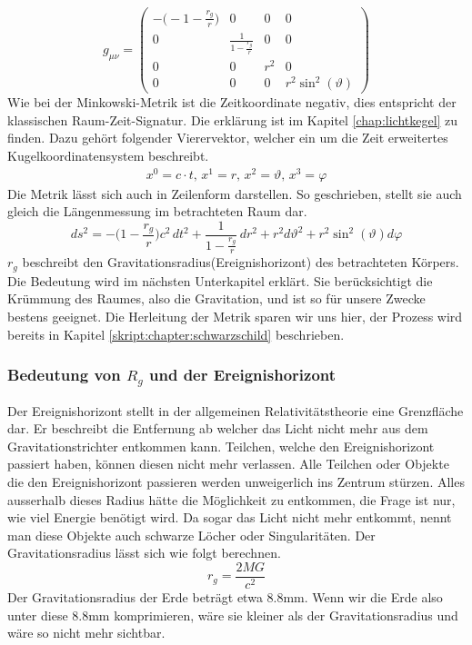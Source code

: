 \begin{refsection}
	\begin{equation}
	g_{\mu\nu}=
	\begin{pmatrix}
	-\biggl(-1- \displaystyle \frac{r_{g}}{r}\biggr) & 0 & 0 & 0 \\
	0 & \frac{\displaystyle 1}{\displaystyle1-\frac{r_{g}}{r}} & 0 & 0 \\
	0 & 0 & r^{2} & 0 \\
	0 & 0 & 0 & r^{2}\sin^{2}(\vartheta)
	\end{pmatrix}
	\end{equation}
	Wie bei der Minkowski-Metrik ist die Zeitkoordinate negativ, dies entspricht der klassischen Raum-Zeit-Signatur. Die erklärung ist im Kapitel \ref{chap:lichtkegel} zu finden.
	Dazu gehört folgender Vierervektor, welcher ein um die Zeit erweitertes Kugelkoordinatensystem beschreibt.
	\begin{align*}
	x^{0}=c \cdot t, \,
	x^{1}=r,\,
	x^{2}=\vartheta,\,
	x^{3}=\varphi
	\end{align*}
	Die Metrik lässt sich auch in Zeilenform darstellen. So geschrieben, stellt sie auch gleich die Längenmessung im betrachteten Raum dar.
	\begin{equation}
	ds^2
	=
	-\biggl(1-\frac{r_g}r\biggr)c^2\,dt^2
	+
	\frac{1}{\displaystyle 1-\frac{r_g}r}\,dr^2 
	+
	r^2d\vartheta^2 
	+ 
	r^2\sin^2(\vartheta)d\varphi
	\end{equation}
	$r_g$ beschreibt den Gravitationsradius(Ereignishorizont) des betrachteten Körpers. Die Bedeutung wird im nächsten Unterkapitel erklärt.
	Sie berücksichtigt die Krümmung des Raumes, also die Gravitation, und ist so für unsere Zwecke bestens geeignet. 
	Die Herleitung der Metrik sparen wir uns hier, der Prozess wird bereits in Kapitel \ref{skript:chapter:schwarzschild} beschrieben.
	
	\subsubsection{Bedeutung von $R_{g}$ und der Ereignishorizont}
	
	Der Ereignishorizont stellt in der allgemeinen Relativitätstheorie eine Grenzfläche dar. Er beschreibt die Entfernung ab welcher das Licht nicht mehr aus dem Gravitationstrichter entkommen kann. Teilchen, welche den Ereignishorizont passiert haben, können diesen nicht mehr verlassen. Alle Teilchen oder Objekte die den Ereignishorizont passieren werden unweigerlich ins Zentrum stürzen. Alles ausserhalb dieses Radius hätte die Möglichkeit zu entkommen, die Frage ist nur, wie viel Energie benötigt wird. Da sogar das Licht nicht mehr entkommt, nennt man diese Objekte auch schwarze Löcher oder Singularitäten.
	Der Gravitationsradius lässt sich wie folgt berechnen.
	\begin{equation} \label{Gravitationsradius}
	r_{g}= \frac{2MG}{c^2}
	\end{equation}
	Der Gravitationsradius der Erde beträgt etwa 8.8mm. Wenn wir die Erde also unter diese 8.8mm komprimieren, wäre sie kleiner als der Gravitationsradius und wäre so nicht mehr sichtbar.
	

\end{refsection}
